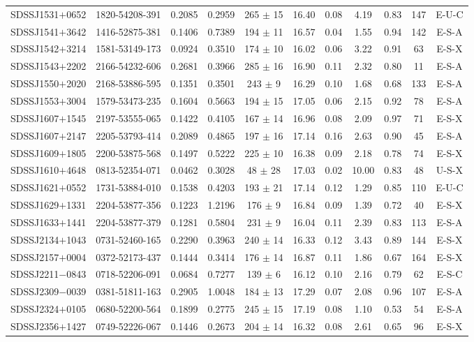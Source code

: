 \documentclass{emulateapj}
\begin{document}
\begin{table*}[htbp]
\begin{center}
\begin{tabular}{c c c c c c c c c c c}
SDSSJ1531$+$0652 & 1820-54208-391 & 0.2085 & 0.2959 & 265 $\pm$   15 & 16.40 & 0.08 & 4.19 & 0.83 & 147 & E-U-C \\ 
SDSSJ1541$+$3642 & 1416-52875-381 & 0.1406 & 0.7389 & 194 $\pm$   11 & 16.57 & 0.04 & 1.55 & 0.94 & 142 & E-S-A \\ 
SDSSJ1542$+$3214 & 1581-53149-173 & 0.0924 & 0.3510 & 174 $\pm$   10 & 16.02 & 0.06 & 3.22 & 0.91 & 63 & E-S-X \\ 
SDSSJ1543$+$2202 & 2166-54232-606 & 0.2681 & 0.3966 & 285 $\pm$   16 & 16.90 & 0.11 & 2.32 & 0.80 & 11 & E-S-A \\ 
SDSSJ1550$+$2020 & 2168-53886-595 & 0.1351 & 0.3501 & 243 $\pm$    9 & 16.29 & 0.10 & 1.68 & 0.68 & 133 & E-S-A \\ 
SDSSJ1553$+$3004 & 1579-53473-235 & 0.1604 & 0.5663 & 194 $\pm$   15 & 17.05 & 0.06 & 2.15 & 0.92 & 78 & E-S-A \\ 
SDSSJ1607$+$1545 & 2197-53555-065 & 0.1422 & 0.4105 & 167 $\pm$   14 & 16.96 & 0.08 & 2.09 & 0.97 & 71 & E-S-X \\ 
SDSSJ1607$+$2147 & 2205-53793-414 & 0.2089 & 0.4865 & 197 $\pm$   16 & 17.14 & 0.16 & 2.63 & 0.90 & 45 & E-S-A \\ 
SDSSJ1609$+$1805 & 2200-53875-568 & 0.1497 & 0.5222 & 225 $\pm$   10 & 16.38 & 0.09 & 2.18 & 0.78 & 74 & E-S-X \\ 
SDSSJ1610$+$4648 & 0813-52354-071 & 0.0462 & 0.3028 & 48 $\pm$   28 & 17.03 & 0.02 & 10.00 & 0.83 & 48 & U-S-X \\ 
SDSSJ1621$+$0552 & 1731-53884-010 & 0.1538 & 0.4203 & 193 $\pm$   21 & 17.14 & 0.12 & 1.29 & 0.85 & 110 & E-U-C \\ 
SDSSJ1629$+$1331 & 2204-53877-356 & 0.1223 & 1.2196 & 176 $\pm$    9 & 16.84 & 0.09 & 1.39 & 0.72 & 40 & E-S-X \\ 
SDSSJ1633$+$1441 & 2204-53877-379 & 0.1281 & 0.5804 & 231 $\pm$    9 & 16.04 & 0.11 & 2.39 & 0.83 & 113 & E-S-A \\ 
SDSSJ2134$+$1043 & 0731-52460-165 & 0.2290 & 0.3963 & 240 $\pm$   14 & 16.33 & 0.12 & 3.43 & 0.89 & 144 & E-S-X \\ 
SDSSJ2157$+$0004 & 0372-52173-437 & 0.1444 & 0.3414 & 176 $\pm$   14 & 16.87 & 0.11 & 1.86 & 0.67 & 164 & E-S-X \\ 
SDSSJ2211$-$0843 & 0718-52206-091 & 0.0684 & 0.7277 & 139 $\pm$    6 & 16.12 & 0.10 & 2.16 & 0.79 & 62 & E-S-C \\ 
SDSSJ2309$-$0039 & 0381-51811-163 & 0.2905 & 1.0048 & 184 $\pm$   13 & 17.29 & 0.07 & 2.08 & 0.96 & 107 & E-S-A \\ 
SDSSJ2324$+$0105 & 0680-52200-564 & 0.1899 & 0.2775 & 245 $\pm$   15 & 17.19 & 0.08 & 1.10 & 0.53 & 54 & E-S-A \\ 
SDSSJ2356$+$1427 & 0749-52226-067 & 0.1446 & 0.2673 & 204 $\pm$   14 & 16.32 & 0.08 & 2.61 & 0.65 & 96 & E-S-X \\ 
\hline \hline
\end{tabular}
\end{center}
\end{table*}
\end{document}
